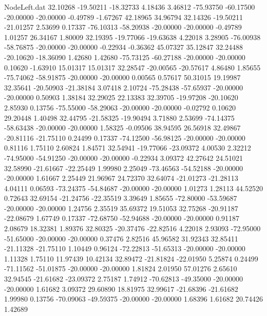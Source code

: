 \begin{filecontents}{NodeLeft.dat}
  32.10268  -19.50211  -18.32733     4.18436    3.46812  -75.93750  -60.17500  -20.00000  -20.00000   -0.49789   -1.67267   42.18965   34.96794
  32.14326  -19.50211  -21.01257     2.53699    0.17337  -76.10313  -58.20938  -20.00000  -20.00000   -0.49789    1.01257   26.34167    1.80009
  32.19395  -19.77066  -19.63638     4.22018    3.28905  -76.00938  -58.76875  -20.00000  -20.00000   -0.22934   -0.36362   45.07327   35.12847
  32.24488  -20.10620  -18.36090     1.42680    1.42680  -75.73125  -60.27188  -20.00000  -20.00000    0.10620   -1.63910   15.01317   15.01317
  32.28547  -20.00565  -20.57617     4.86480    1.85655  -75.74062  -58.91875  -20.00000  -20.00000    0.00565    0.57617   50.31015   19.19987
  32.35641  -20.50903  -21.38184     3.07418    2.10724  -75.28438  -57.65937  -20.00000  -20.00000    0.50903    1.38184   32.29025   22.13383
  32.39705  -19.97208  -20.10620     2.85930    0.13756  -75.55000  -58.29063  -20.00000  -20.00000   -0.02792    0.10620   29.20448    1.40498
  32.44795  -21.58325  -19.90494     3.71880    2.53699  -74.14375  -58.63438  -20.00000  -20.00000    1.58325   -0.09506   38.94595   26.56918
  32.49867  -20.81116  -21.75110     0.24499    0.17337  -74.12500  -56.98125  -20.00000  -20.00000    0.81116    1.75110    2.60824    1.84571
  32.54941  -19.77066  -23.09372     4.00530    2.32212  -74.95000  -54.91250  -20.00000  -20.00000   -0.22934    3.09372   42.27642   24.51021
  32.58990  -21.61667  -22.25449     1.99980    2.25049  -73.46563  -54.52188  -20.00000  -20.00000    1.61667    2.25449   21.96967   24.72370
  32.64074  -21.01273  -21.28113     4.04111    0.06593  -73.24375  -54.84687  -20.00000  -20.00000    1.01273    1.28113   44.52520    0.72643
  32.69154  -21.24756  -22.35519     3.39649    1.85655  -72.80000  -53.59687  -20.00000  -20.00000    1.24756    2.35519   35.69372   19.51053
  32.75268  -20.91187  -22.08679     1.67749    0.17337  -72.68750  -52.94688  -20.00000  -20.00000    0.91187    2.08679   18.32381    1.89376
  32.80325  -20.37476  -22.82516     4.22018    2.93093  -72.95000  -51.65000  -20.00000  -20.00000    0.37476    2.82516   45.96582   31.92343
  32.85411  -21.11328  -21.75110     1.10449    0.96124  -72.22813  -51.65313  -20.00000  -20.00000    1.11328    1.75110   11.97439   10.42134
  32.89472  -21.81824  -22.01950     5.25874    0.24499  -71.11562  -51.01875  -20.00000  -20.00000    1.81824    2.01950   57.01276    2.65610
  32.94545  -21.61682  -23.09372     2.75187    1.74912  -70.62813  -49.35000  -20.00000  -20.00000    1.61682    3.09372   29.60890   18.81975
  32.99617  -21.68396  -21.61682     1.99980    0.13756  -70.09063  -49.59375  -20.00000  -20.00000    1.68396    1.61682   20.74426    1.42689

\end{filecontents}
